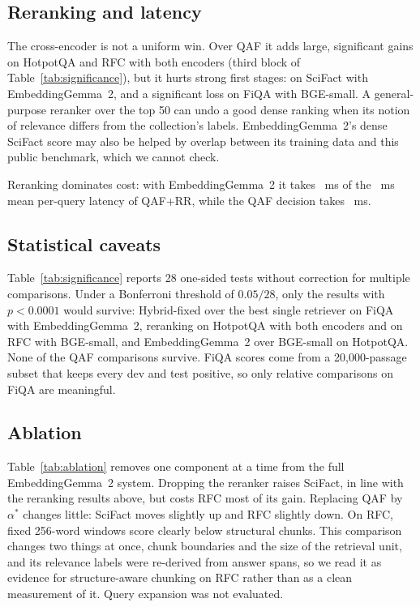 
\subsection{Reranking and latency}
The cross-encoder is not a uniform win. Over QAF it adds large, significant
gains on HotpotQA and RFC with both encoders (third block of
Table~\ref{tab:significance}), but it hurts strong first stages:
\RerankGainSciFact{} on SciFact with EmbeddingGemma~2, and a significant loss
on FiQA with BGE-small. A general-purpose reranker over the top 50 can undo a
good dense ranking when its notion of relevance differs from the collection's
labels. EmbeddingGemma~2's dense SciFact score may also be helped by overlap
between its training data and this public benchmark, which we cannot check.

Reranking dominates cost: with EmbeddingGemma~2 it takes \RerankLatencyMs{}~ms
of the \TotalLatencyMs{}~ms mean per-query latency of QAF+RR, while the QAF
decision takes \QAFlatencyMs{}~ms.

\subsection{Statistical caveats}
Table~\ref{tab:significance} reports 28 one-sided tests without correction
for multiple comparisons. Under a Bonferroni threshold of $0.05/28$, only the
results with $p<0.0001$ would survive: Hybrid-fixed over the best single
retriever on FiQA with EmbeddingGemma~2, reranking on HotpotQA with both
encoders and on RFC with BGE-small, and EmbeddingGemma~2 over BGE-small on
HotpotQA. None of the QAF comparisons survive. FiQA scores come from a
20{,}000-passage subset that keeps every dev and test positive, so only
relative comparisons on FiQA are meaningful.

\subsection{Ablation}
Table~\ref{tab:ablation} removes one component at a time from the full
EmbeddingGemma~2 system. Dropping the reranker raises SciFact, in line with
the reranking results above, but costs RFC most of its gain. Replacing QAF by
$\alpha^{*}$ changes little: SciFact moves slightly up and RFC slightly down.
On RFC, fixed 256-word windows score clearly below structural chunks. This
comparison changes two things at once, chunk boundaries and the size of the
retrieval unit, and its relevance labels were re-derived from answer spans,
so we read it as evidence for structure-aware chunking on RFC rather than as
a clean measurement of it. Query expansion was not evaluated.

